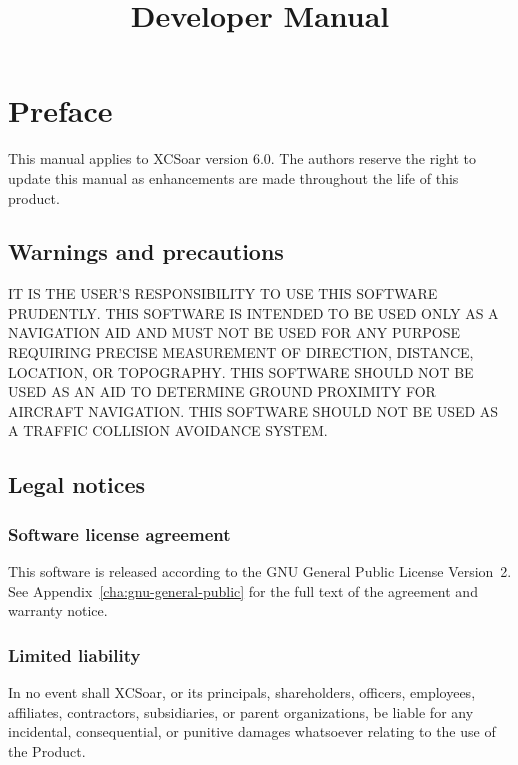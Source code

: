 \documentclass[a4paper,12pt]{refrep}
\title{Developer Manual}
\begin{document}
\maketitle




\chapter*{Preface}

This manual applies to XCSoar version 6.0.  The authors reserve the
right to update this manual as enhancements are made throughout the
life of this product.

\section*{Warnings and precautions}

\warning IT IS THE USER'S RESPONSIBILITY TO USE THIS SOFTWARE PRUDENTLY. THIS
SOFTWARE IS INTENDED TO BE USED ONLY AS A NAVIGATION AID AND MUST NOT
BE USED FOR ANY PURPOSE REQUIRING PRECISE MEASUREMENT OF DIRECTION,
DISTANCE, LOCATION, OR TOPOGRAPHY. THIS SOFTWARE SHOULD NOT BE USED AS
AN AID TO DETERMINE GROUND PROXIMITY FOR AIRCRAFT NAVIGATION.
THIS SOFTWARE SHOULD NOT BE USED AS A TRAFFIC COLLISION AVOIDANCE SYSTEM.


\section*{Legal notices}

\subsection*{Software license agreement}

This software is released according to the GNU General Public License
Version~2.  See Appendix~\ref{cha:gnu-general-public} for the full
text of the agreement and warranty notice.

\subsection*{Limited liability}

In no event shall XCSoar, or its principals, shareholders, officers,
employees, affiliates, contractors, subsidiaries, or parent
organizations, be liable for any incidental, consequential, or
punitive damages whatsoever relating to the use of the Product.
\end{document}
